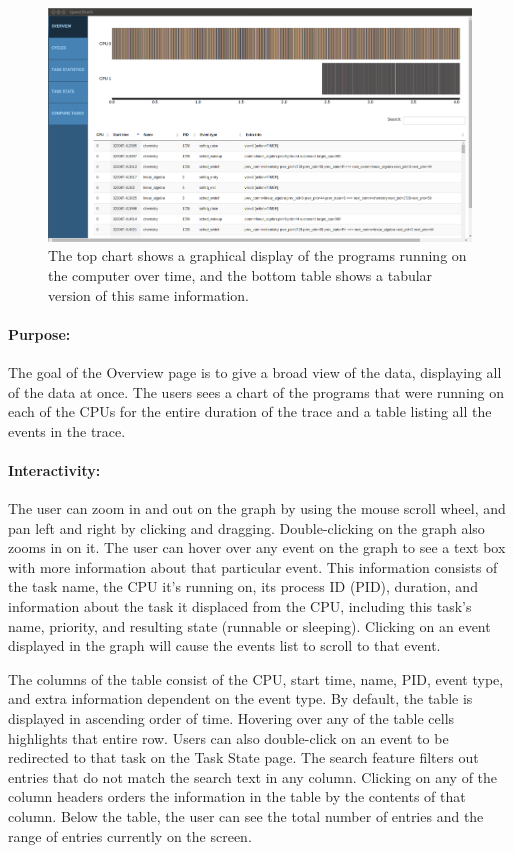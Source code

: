 \documentclass{hmcclinic}
\begin{document}
  \begin{figure}[H]
  \centering
      \includegraphics[width=5in]{overview-page.png}
  \caption{The top chart shows a graphical display of the programs running on the computer over time, and the bottom table shows a tabular version of this same information.}
  \end{figure}

\paragraph{Purpose:} 
The goal of the Overview page is to give a broad view of the data, displaying
all of the data at once.  The users sees a chart of the programs that were
running on each of the CPUs for the entire duration of the trace and a table
listing all the events in the trace.

\paragraph{Interactivity:} The user can zoom in and out on the graph by using
the mouse scroll wheel, and pan left and right by clicking and dragging.
Double-clicking on the graph also zooms in on it. The user can hover over any
event on the graph to see a text box with more information about that particular
event.  This information consists of the task name, the CPU it's running on, its
process ID (PID), duration, and information about the task it displaced from the
CPU, including this task's name, priority, and resulting state (runnable or
sleeping). Clicking on an event displayed in the graph will cause the
events list to scroll to that event.

The columns of the table consist of the CPU, start time, name, PID, event type,
and extra information dependent on the event type. By default, the table is
displayed in ascending order of time.  Hovering over any of the table cells
highlights that entire row. Users can also double-click on an event to be
redirected to that task on the Task State page.  The search feature filters out
entries that do not match the search text in any column.  Clicking on any of the
column headers orders the information in the table by the contents of that
column.  Below the table, the user can see the total number of entries and the
range of entries currently on the screen.
\end{document}
